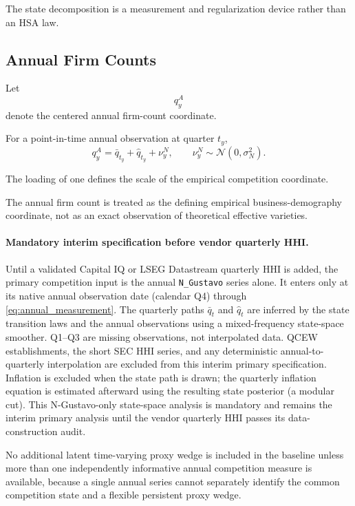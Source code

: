 \documentclass[11pt]{article}
\newcommand{\Normal}{\mathcal{N}}
\begin{document}
The state decomposition is a measurement and regularization device rather than an HSA law.

\subsection{Annual Firm Counts}

Let
\begin{equation}
q_y^A
\end{equation}
denote the centered annual firm-count coordinate.

For a point-in-time annual observation at quarter \(t_y\),
\begin{equation}
q_y^A
=
\bar q_{t_y}
+
\hat q_{t_y}
+
\nu_y^N,
\qquad
\nu_y^N
\sim
\Normal(0,\sigma_N^2).
\label{eq:annual_measurement}
\end{equation}

The loading of one defines the scale of the empirical competition coordinate.

The annual firm count is treated as the defining empirical business-demography coordinate, not as an exact observation of theoretical effective varieties.

\paragraph{Mandatory interim specification before vendor quarterly HHI.}
Until a validated Capital IQ or LSEG Datastream quarterly HHI is added, the
primary competition input is the annual \texttt{N\_Gustavo} series alone.  It
enters only at its native annual observation date (calendar Q4) through
\cref{eq:annual_measurement}.  The quarterly paths $\bar q_t$ and $\hat q_t$
are inferred by the state transition laws and the annual observations using a
mixed-frequency state-space smoother.  Q1--Q3 are missing observations, not
interpolated data.  QCEW establishments, the short SEC HHI series, and any
deterministic annual-to-quarterly interpolation are excluded from this interim
primary specification.  Inflation is excluded when the state path is drawn;
the quarterly inflation equation is estimated afterward using the resulting
state posterior (a modular cut).  This N-Gustavo-only state-space analysis is
mandatory and remains the interim primary analysis until the vendor quarterly
HHI passes its data-construction audit.

No additional latent time-varying proxy wedge is included in the baseline unless more than one independently informative annual competition measure is available, because a single annual series cannot separately identify the common competition state and a flexible persistent proxy wedge.
\end{document}
